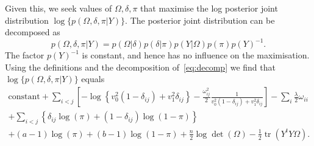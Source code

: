 \documentclass{scrartcl}
\DeclareMathOperator{\tr}{tr}
\newcommand{\1}{\mathds{1}}
\newcommand{\inv}{^{-1}}
\begin{document}
Given this, we seek values of $\Omega, \delta, \pi$ that
maximise the log posterior joint distribution $\log\{p(\Omega, \delta, \pi |
	Y)\}$. The posterior joint distribution can be
decomposed as
\begin{equation}\label{eq:decomp}
	p(\Omega, \delta, \pi | Y) = p(\Omega | \delta) p(\delta | \pi) p(Y |
	\Omega) p(\pi) p(Y)\inv.
\end{equation}
The factor $p(Y)\inv$ is constant, and hence has no influence on the
maximisation. Using the definitions and the decomposition of~\eqref{eq:decomp} we find that
$\log\{p(\Omega, \delta, \pi | Y)\}$ equals
\begin{multline}\label{eq:joint}
	\text{constant} + \sum_{i<j} \left[-\log\left\{v_0^2 (1 - \delta_{ij}) + v_1^2 \delta_{ij}\right\} - \frac{\omega^2_{ij}}{2} \frac{1}{v_0^2 (1 - \delta_{ij}) + v_1^2 \delta_{ij}} \right] - \sum_i \frac{\lambda}{2} \omega_{ii}\\
	+ \sum_{i < j} \left\{\delta_{ij} \log(\pi) + (1 - \delta_{ij})\log(1 - \pi)\right\}                                                                                                                \\
	+ (a-1) \log(\pi) + (b-1)\log(1 - \pi) + \frac{n}{2} \log\det(\Omega) -\frac{1}{2}\tr (Y^t Y \Omega).
\end{multline}
\end{document}

